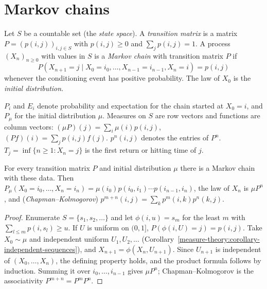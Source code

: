 \section{Markov chains}\label{martingales:section-markov-chains}

\begin{definition}\label{martingales:definition-markov-chain}
Let $S$ be a countable set (the \emph{state space}). A \emph{transition matrix} is a matrix $P = (p(i, j))_{i,j \in S}$ with $p(i, j) \geq 0$ and $\sum_jp(i, j) = 1$. A process $(X_n)_{n \geq 0}$ with values in $S$ is a
\emph{Markov chain} with transition matrix $P$ if
\[
P(X_{n+1} = j \mid X_0 = i_0, \ldots, X_{n-1} = i_{n-1}, X_n = i) = p(i, j)
\]
whenever the conditioning event has positive probability. The law of $X_0$ is the \emph{initial distribution}.
\end{definition}

\begin{notation}\label{martingales:notation-markov}
$P_i$ and $E_i$ denote probability and expectation for the chain started at $X_0 = i$, and $P_\mu$ for the initial distribution $\mu$. Measures on $S$ are row vectors and functions are column vectors: $(\mu P)(j) = \sum_i\mu(i)p(i, j)$,
$(Pf)(i) = \sum_jp(i, j)f(j)$. $p^n(i, j)$ denotes the entries of $P^n$. $T_j = \inf\{n \geq 1 : X_n = j\}$ is the first return or hitting time of $j$.
\end{notation}

\begin{proposition}\label{martingales:proposition-markov-construction}
For every transition matrix $P$ and initial distribution $\mu$ there is a Markov chain with these data. Then $P_\mu(X_0 = i_0, \ldots, X_n = i_n) = \mu(i_0)p(i_0, i_1)\cdots p(i_{n-1}, i_n)$, the law of $X_n$ is $\mu P^n$, and
(\emph{Chapman--Kolmogorov}) $p^{m+n}(i, j) = \sum_kp^m(i, k)p^n(k, j)$.
\end{proposition}

\begin{proof}
Enumerate $S = \{s_1, s_2, \ldots\}$ and let $\phi(i, u) = s_m$ for the least $m$ with $\sum_{l \leq m}p(i, s_l) \geq u$. If $U$ is uniform on $(0, 1]$, $P(\phi(i, U) = j) = p(i, j)$. Take $X_0 \sim \mu$ and independent uniform
$U_1, U_2, \ldots$ (Corollary~\ref{measure-theory:corollary-independent-sequences}), and $X_{n+1} = \phi(X_n, U_{n+1})$. Since $U_{n+1}$ is independent of $(X_0, \ldots, X_n)$, the defining property holds, and the product formula follows
by induction. Summing it over $i_0, \ldots, i_{n-1}$ gives $\mu P^n$; Chapman--Kolmogorov is the associativity $P^{m+n} = P^mP^n$.
\end{proof}

